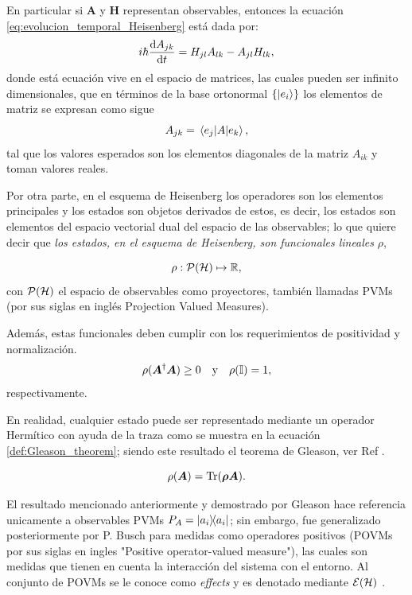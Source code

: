 \documentclass[../Main.tex]{subfiles}
\begin{document}
En particular si $\bm{A}$ y $\bm{H}$ representan observables, entonces la ecuación \eqref{eq:evolucion_temporal_Heisenberg} está dada por:
\begin{equation}
    i\hbar \dv{A_{jk}}{t}=H_{jl}A_{lk}-A_{jl}H_{lk},
\end{equation}
donde está ecuación vive en el espacio de matrices, las cuales pueden ser infinito dimensionales, que en términos de la base ortonormal $\qty{\ket{e_i}}$ los elementos de matriz se expresan como sigue
\begin{equation}
    A_{jk}=\mel{e_j}{A}{e_k},
    \label{def:elemto_matriz}
\end{equation}
tal que los valores esperados son los elementos diagonales de la matriz $A_{ik}$ y toman valores reales.

Por otra parte, en el esquema de Heisenberg los operadores son los elementos principales y los estados son objetos derivados de estos, es decir, los estados son elementos del espacio vectorial dual del espacio de las observables; lo que quiere decir que \emph{los estados, en el esquema de Heisenberg, son funcionales lineales} $\rho$,

\begin{equation}
    \rho : \mathcal{P}(\mathcal{H}) \mapsto \mathbb{R},
    \label{def:rho_is_in_reals}
\end{equation}
con $\mathcal{P}(\mathcal{H})$ el espacio de observables como proyectores, también llamadas PVMs (por sus siglas en inglés Projection Valued Measures).

Además, estas funcionales deben cumplir con los requerimientos de positividad y normalización.
\begin{equation}
    \rho(\bm{A}^\dagger\bm{A})\ge0\qq{y}\rho(\Id)=1,
\end{equation}
respectivamente.

En realidad, cualquier estado puede ser representado mediante un operador Hermítico con ayuda de la traza como se muestra en la ecuación \eqref{def:Gleason_theorem}; siendo este resultado el teorema de Gleason, ver Ref \cite{Gleason1957}. 

\begin{equation}
    \rho\qty(\bm{A})=\Tr(\bm{\rho} \bm{A}).
    \label{def:Gleason_theorem}
\end{equation}

El resultado mencionado anteriormente y demostrado por Gleason hace referencia unicamente a observables PVMs $P_A=\op{a_i}$; sin embargo, fue generalizado posteriormente por P. Busch \cite{PhysRevLett.91.120403} para medidas como operadores positivos (POVMs por sus siglas en ingles "Positive operator-valued measure"), las cuales son medidas que tienen en cuenta la interacción del sistema con el entorno. Al conjunto de POVMs se le conoce como \emph{effects} y es denotado mediante $\mathcal{E}(\mathcal{H})$ \cite{acharya2021informationallycomplete}.
\end{document}
